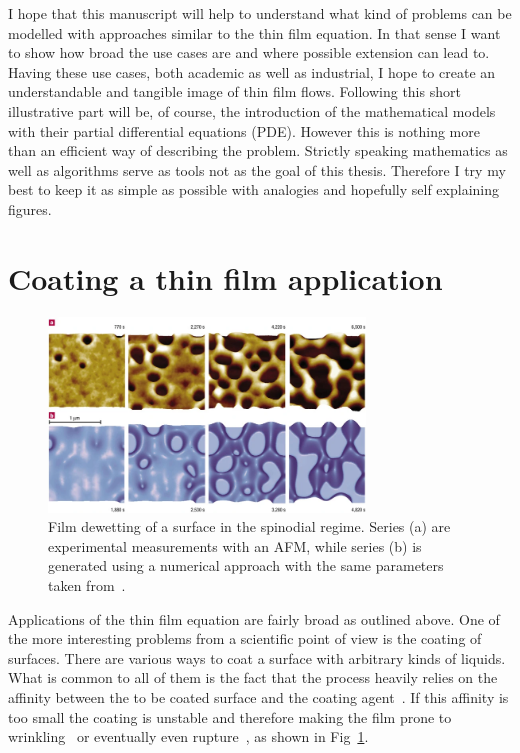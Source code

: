 I hope that this manuscript will help to understand what kind of problems can be modelled with approaches similar to the thin film equation.
In that sense I want to show how broad the use cases are and where possible extension can lead to.
Having these use cases, both academic as well as industrial, I hope to create an understandable and tangible image of thin film flows. 
Following this short illustrative part will be, of course, the introduction of the mathematical models with their partial differential equations (PDE). 
However this is nothing more than an efficient way of describing the problem.
Strictly speaking mathematics as well as algorithms serve as tools not as the goal of this thesis. 
Therefore I try my best to keep it as simple as possible with analogies and hopefully self explaining figures.

\section{Coating a thin film application}
\label{section:applications}
\begin{figure}
    \centering
    \includegraphics[width=0.75\textwidth]{graphics/41563_2003_Article_BFnmat788_Fig1_HTML.png}
    \caption{Film dewetting of a surface in the spinodial regime.
    Series (a) are experimental measurements with an AFM, while series (b) is generated using a numerical approach with the same parameters taken from~\cite{becker2003complex}.}
    \label{fig:becker_dewetting}
\end{figure}
Applications of the thin film equation are fairly broad as outlined above.
One of the more interesting problems from a scientific point of view is the coating of surfaces.
There are various ways to coat a surface with arbitrary kinds of liquids.
What is common to all of them is the fact that the process heavily relies on the affinity between the to be coated surface and the coating agent~\cite{RevModPhys.81.739}.
If this affinity is too small the coating is unstable and therefore making the film prone to wrinkling~\cite{DASILVASOBRINHO19991204} or eventually even rupture~\cite{RevModPhys.69.931, RevModPhys.81.1131, becker2003complex}, as shown in Fig~\ref{fig:becker_dewetting}.

